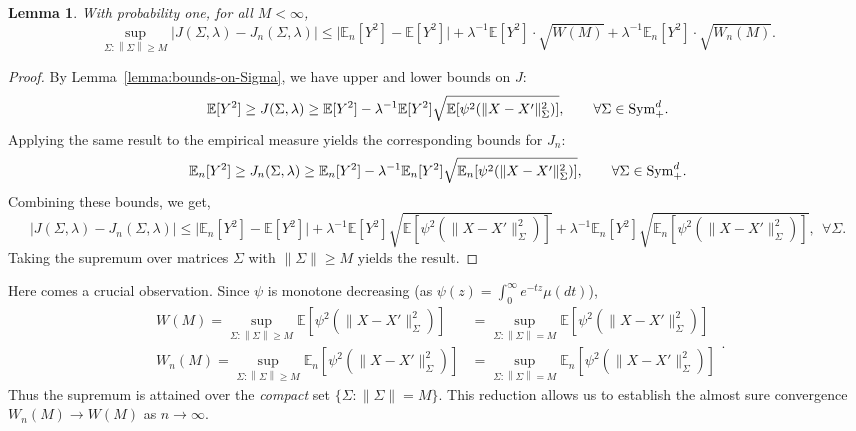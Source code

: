 \documentclass[sn-mathphys-num]{sn-jnl}%
\numberwithin{equation}{section}
\newcommand{\E}{\mathbb{E}}
\newcommand{\norm}[1]{\left\|{#1}\right\|} %
\newtheorem{lemma}{Lemma}
\newcommand{\Sym}{{\rm \mathrm{Sym}}}
\theoremstyle{thmstyleone}%
\theoremstyle{thmstyletwo}%
\theoremstyle{thmstylethree}%
\begin{document}
\begin{lemma}
\label{lemma:deterministic-bounds}
With probability one, for all $M < \infty$,
\begin{equation*}
	\sup_{\Sigma: \norm{\Sigma} \ge M} \bigl|J(\Sigma, \lambda) - J_n(\Sigma, \lambda)\bigr| \le 
		\bigl| \E_n[Y^2] - \E[Y^2] \bigr|
	+ 
	\lambda^{-1} \E[Y^2] \cdot \sqrt{W(M)}
	+ 
	\lambda^{-1} \E_n[Y^2]  \cdot \sqrt{W_n(M)}.
\end{equation*}
\end{lemma} 
\begin{proof} 
By Lemma~\ref{lemma:bounds-on-Sigma}, we have upper and lower bounds on $J$: 
\begin{equation*}
	\E[Y^2] \ge J(\Sigma, \lambda) 
	\ge 
	\E[Y^2] 
	- 
	\lambda^{-1} 
	 \E[Y^2]  \sqrt{\E[\psi^2\!\left(\|X - X'\|_{\Sigma}^2\right)]},
	\qquad 
	\forall \Sigma \in \Sym_+^d.
\end{equation*}
Applying the same result to the empirical measure yields the corresponding bounds for $J_n$:
\begin{equation*}
	\E_n[Y^2]  \ge J_n(\Sigma, \lambda) 
	\ge 
	\E_n[Y^2] 
	- 
	\lambda^{-1} 
	 \E_n[Y^2]  \sqrt{\E_n[\psi^2\!\left(\|X - X'\|_{\Sigma}^2\right)]},
	\qquad 
	\forall \Sigma \in \Sym_+^d.
\end{equation*}
Combining these bounds, we get, 
\begin{equation*}
	\bigl|J(\Sigma, \lambda) - J_n(\Sigma, \lambda)\bigr|
	\le 
	\bigl| \E_n[Y^2] - \E[Y^2] \bigr|
	+ 
	\lambda^{-1} \E[Y^2] 
	\sqrt{\E\!\left[\psi^2\!\left(\|X - X'\|_{\Sigma}^2\right)\right]}
	+ 
	\lambda^{-1} \E_n[Y^2] 
	\sqrt{\E_n\!\left[\psi^2\!\left(\|X - X'\|_{\Sigma}^2\right)\right]},~~\forall \Sigma.
\end{equation*}
Taking the supremum over matrices $\Sigma$ with $\|\Sigma\| \ge M$ yields the result. 
\end{proof} 

Here comes a crucial observation. Since $\psi$ is monotone decreasing (as $\psi(z) = \int_0^\infty e^{-tz} \mu(dt)$), 
\begin{equation}
\label{eqn:identities-for-U-U_n}
\begin{split} 
	W(M) = \sup_{\Sigma: \norm{\Sigma} \ge M} \E\!\left[\psi^2\!\left(\|X - X'\|_{\Sigma}^2\right)\right]
		&= \sup_{\Sigma: \norm{\Sigma} = M} \E\!\left[\psi^2\!\left(\|X - X'\|_{\Sigma}^2\right)\right] \\
	W_n(M) = \sup_{\Sigma: \norm{\Sigma} \ge M} \E_n\!\left[\psi^2\!\left(\|X - X'\|_{\Sigma}^2\right)\right]
		&= \sup_{\Sigma: \norm{\Sigma} = M} \E_n\!\left[\psi^2\!\left(\|X - X'\|_{\Sigma}^2\right)\right]
\end{split} .
\end{equation}
Thus the supremum is attained over the \emph{compact} set $\{\Sigma : \|\Sigma\| = M\}$.
This reduction allows us to establish the almost sure convergence $W_n(M) \to W(M)$ as $n \to \infty$.
\end{document}
